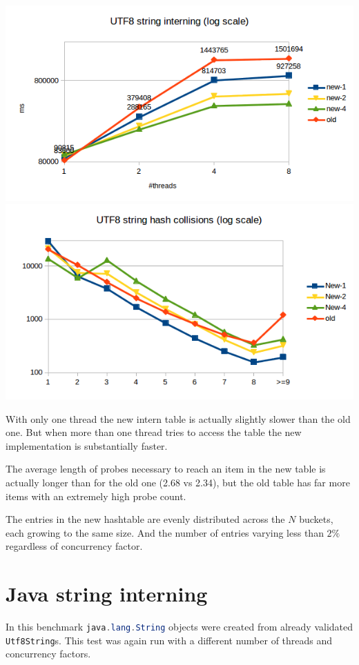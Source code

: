 \documentclass[12pt,a4paper,oneside]{article}
\newcommand{\cpp}[1]{\lstinline[language=C++]{#1}}
\newcommand{\java}[1]{\lstinline[language=Java]{#1}}
\begin{document}
	\includegraphics{utf8-intern-time.png}
	\includegraphics{utf8-intern-collisions.png}

	With only one thread the new intern table is actually slightly slower than the old one.
	But when more than one thread tries to access the table the new implementation is substantially faster.

	The average length of probes necessary to reach an item in the new table is actually longer than for the old
	one (2.68 vs 2.34), but the old table has far more items with an extremely high probe count.

	The entries in the new hashtable are evenly distributed across the $N$ buckets, each growing to the same size.
	And the number of entries varying less than $2\%$ regardless of concurrency factor.

\section{Java string interning}
	In this benchmark \java{java.lang.String} objects were created from already validated \cpp{Utf8String}s.
	This test was again run with a different number of threads and concurrency factors.
\end{document}
